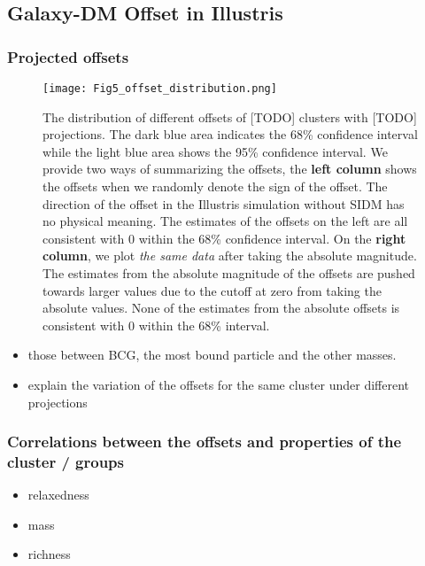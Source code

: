 \subsection{Galaxy-DM Offset in Illustris}
\subsubsection{Projected offsets}
\begin{figure*}
	\begin{center}
	\texttt{[image: Fig5\_offset\_distribution.png]}
	\caption{ 		
		The distribution of different offsets of [TODO] clusters with [TODO]
		projections. The dark blue area indicates the 68\% confidence interval
		while the light blue area shows the 95\% confidence interval. 
		We provide two ways of summarizing the offsets, the {\bf left column} shows
		the offsets when we randomly denote the sign of the offset. The
		direction of the offset in the Illustris simulation without SIDM has no 
		physical meaning.
		The estimates of the offsets on the left are all consistent with 0 within
		the 68\% confidence interval.
		On the {\bf right column}, we plot {\it the same data} after taking the
		absolute magnitude. The estimates from the absolute magnitude of the
		offsets are pushed towards larger values due to the cutoff at zero from
		taking the absolute values. None of the estimates from the
		absolute offsets is consistent with 0 within the 68\% interval.
				\label{fig:offset_distributions}
	}
\end{center}
\end{figure*}



\begin{itemize}
\item those between BCG, the most bound particle and the other masses. 
\item explain the variation of the offsets for the same cluster under different 
projections 
\end{itemize}


\subsubsection{Correlations between the offsets and properties of the 
cluster / groups}
\begin{itemize}
\item relaxedness
\item mass 
\item richness  
\end{itemize}



